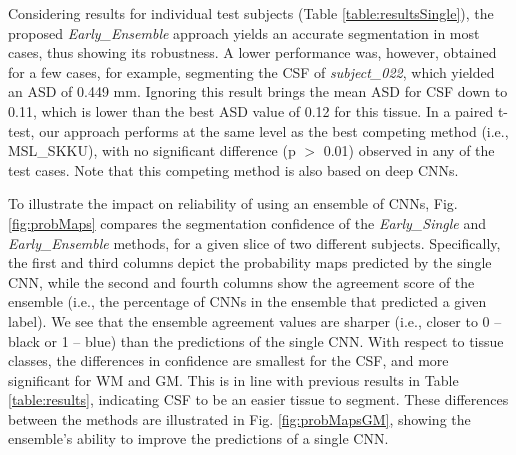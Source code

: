 \documentclass[twoside,espcrc2]{elsarticle}
\begin{document}
Considering results for individual test subjects (Table \ref{table:resultsSingle}), the proposed \textit{Early\_Ensemble} approach yields an accurate segmentation in most cases, thus showing its robustness. A lower performance was, however, obtained for a few cases, for example, segmenting the CSF of \textit{subject\_022}, which yielded an ASD of 0.449 mm. Ignoring this result brings the mean ASD for CSF down to 0.11, which is lower than the best ASD value of 0.12 for this tissue. 
In a paired t-test, 
our approach performs at the same level as the best competing method (i.e., MSL\_SKKU), with no significant difference (p $>$ 0.01) observed in any of the test cases. Note that this competing method is also based on deep CNNs. 

To illustrate the impact on reliability of using an ensemble of CNNs, Fig. \ref{fig:probMaps} compares the segmentation confidence of the \textit{Early\_Single} and \textit{Early\_Ensemble} methods, for a given slice of two different subjects. Specifically, the first and third columns depict the probability maps predicted by the single CNN, while the second and fourth columns show the agreement score of the ensemble (i.e., the percentage of CNNs in the ensemble that predicted a given label). We see that the ensemble agreement values are sharper (i.e., closer to 0 -- black or 1 -- blue) than the predictions of the single CNN. With respect to tissue classes, the differences in confidence are smallest for the CSF, and more significant for WM and GM. This is in line with previous results in Table \ref{table:results}, indicating CSF to be an easier tissue to segment. These differences between the methods are illustrated in Fig. \ref{fig:probMapsGM}, showing the ensemble's ability to improve the predictions of a single CNN. 
\end{document}
